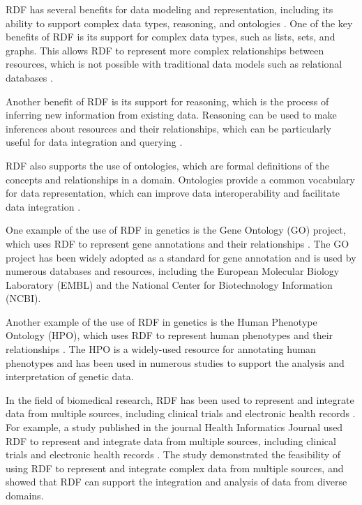 RDF has several benefits for data modeling and representation, including its ability to support complex data types, reasoning, and ontologies \citep{schreiber2014rdf}.  One of the key benefits of RDF is its support for complex data types, such as lists, sets, and graphs.  This allows RDF to represent more complex relationships between resources, which is not possible with traditional data models such as relational databases \citep{allemang2011semantic}.

Another benefit of RDF is its support for reasoning, which is the process of inferring new information from existing data.  Reasoning can be used to make inferences about resources and their relationships, which can be particularly useful for data integration and querying \citep{allemang2011semantic}.

RDF also supports the use of ontologies, which are formal definitions of the concepts and relationships in a domain.  Ontologies provide a common vocabulary for data representation, which can improve data interoperability and facilitate data integration \citep{heath2011linked}.

One example of the use of RDF in genetics is the Gene Ontology (GO) project, which uses RDF to represent gene annotations and their relationships \citep{gene2004gene}.  The GO project has been widely adopted as a standard for gene annotation and is used by numerous databases and resources, including the European Molecular Biology Laboratory (EMBL) and the National Center for Biotechnology Information (NCBI).

Another example of the use of RDF in genetics is the Human Phenotype Ontology (HPO), which uses RDF to represent human phenotypes and their relationships \citep{robinson2010human}.  The HPO is a widely-used resource for annotating human phenotypes and has been used in numerous studies to support the analysis and interpretation of genetic data.

In the field of biomedical research, RDF has been used to represent and integrate data from multiple sources, including clinical trials and electronic health records \citep{luz2015providing}.  For example, a study published in the journal Health Informatics Journal used RDF to represent and integrate data from multiple sources, including clinical trials and electronic health records \citep{luz2015providing}.  The study demonstrated the feasibility of using RDF to represent and integrate complex data from multiple sources, and showed that RDF can support the integration and analysis of data from diverse domains.

